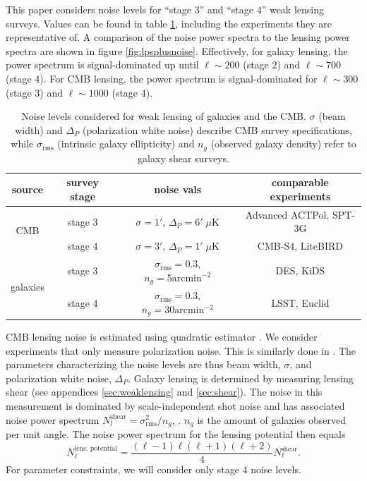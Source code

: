 \documentclass[11pt]{article} %
\begin{document}
This paper considers noise levels for ``stage 3'' and ``stage 4'' weak lensing surveys. Values can be found in table \ref{tab:noiselevels}, including the experiments they are representative of. A comparison of the noise power spectra to the lensing power spectra are shown     in figure \ref{fig:lpsplusnoise}. Effectively, for galaxy lensing, the power spectrum is signal-dominated up until $\ell \sim 200$ (stage 2) and $\ell \sim 700$ (stage 4). For CMB lensing, the power spectrum is signal-dominated for $\ell \sim 300$ (stage 3) and $\ell \sim 1000$ (stage 4). 

\begin{table}[h!]
    \centering
    \begin{tabular}{|c|c|c|c|}
    \hline
    \textbf{source} & \textbf{survey stage} & \textbf{noise vals} & \textbf{comparable experiments} \\
    \hline 
    \multirow{2}{*}{CMB} 
        & stage 3 & $\sigma = 1'$, $\Delta_P = 6' \; \mu \text{K}$ & Advanced ACTPol, SPT-3G \\
    \cline{2-4}
        & stage 4 & $\sigma = 3'$, $\Delta_P = 1' \; \mu \text{K}$ & CMB-S4, LiteBIRD \\
    \hline
    \multirow{2}{*}{galaxies} 
        & stage 3 & $\sigma_{\text{rms}} = 0.3$, $n_g = 5 \text{arcmin}^{-2}$ & DES, KiDS \\
    \cline{2-4}
        & stage 4 & $\sigma_{\text{rms}} = 0.3$, $n_g = 30 \text{arcmin}^{-2}$ & LSST, Euclid \\
    \hline
    \end{tabular}
    \caption{Noise levels considered for weak lensing of galaxies and the CMB. $\sigma$ (beam width) and $\Delta_P$ (polarization white noise) describe CMB survey specifications, while $\sigma_{\text{rms}}$ (intrinsic galaxy ellipticity) and $n_g$ (observed galaxy density) refer to galaxy shear surveys.}
    \label{tab:noiselevels}
\end{table}

CMB lensing noise is estimated using quadratic estimator \cite{cmblensingestimator}. We consider experiments that only measure polarization noise. This is similarly done in \cite{Namikawa_2016}. The parameters characterizing the noise levels are thus beam width, $\sigma$, and polarization white noise, $\Delta_P$. Galaxy lensing is determined by measuring lensing shear (see appendices \ref{sec:weaklensing} and \ref{sec:shear}). The noise in this measurement is dominated by scale-independent shot noise and has associated noise power spectrum $N_l^{\text{shear}} = \sigma_{\text{rms}}^2 / n_g$, \cite{bartelmann2001weak}. $n_g$ is the amount of galaxies observed per unit angle. The noise power spectrum for the lensing potential then equals
\begin{equation*}
    N_\ell^{\text{lens. potential}} = \frac{(\ell-1)\ell(\ell+1)(\ell+2)}{4}N_\ell^{\text{shear}}.
\end{equation*}
For parameter constraints, we will consider only stage 4 noise levels.
\end{document}
